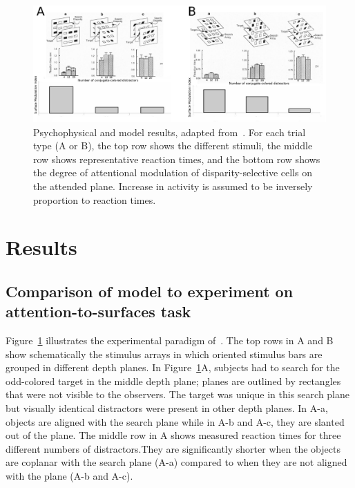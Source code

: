 \begin{figure}[t!] %
\centering
\includegraphics[width=\textwidth]{3D-Surface/figs/nakayama_horizontal}
\makeatletter
\let\@currsize\normalsize
\caption[Psychophysical and model results on attention-to-surfaces task]{Psychophysical and model results, adapted from~\citet{He_Nakayama95}. For each trial type (A or B), the top row shows the different stimuli, the middle row shows representative reaction times, and the bottom row shows the degree of attentional modulation of disparity-selective cells on the  attended plane. Increase in activity is assumed to be inversely proportion to reaction times.}
\label{ModelResults}
\end{figure}

\section{Results}

\subsection{Comparison of model to experiment on attention-to-surfaces task}

Figure~\ref{ModelResults} illustrates the experimental paradigm of~\citet{He_Nakayama95}. The top rows in A and B show schematically the stimulus arrays in which oriented stimulus bars are grouped in different depth planes. In Figure~\ref{ModelResults}A, subjects had to search for the odd-colored target in the middle depth plane; planes are outlined by rectangles that were not visible to the observers. The target was unique in this search plane but visually identical distractors  were present in other depth planes. In A-a, objects are aligned with the search plane while in A-b and A-c, they are slanted out of the plane. The middle row in A shows measured reaction times for three different numbers of distractors.They are significantly shorter when the objects are coplanar with the search plane (A-a) compared to when they are not aligned with the plane (A-b and A-c).

